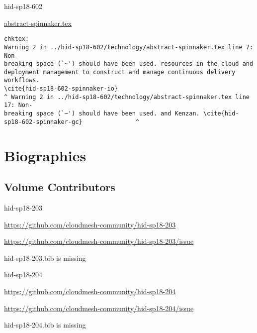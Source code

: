 

\begin{IU}

hid-sp18-602

\href{https://github.com/cloudmesh-community/hid-sp18-602/blob/master//technology/abstract-spinnaker.tex}{abstract-spinnaker.tex}

\begin{tiny}
\begin{verbatim}
chktex:
Warning 2 in ../hid-sp18-602/technology/abstract-spinnaker.tex line 7: Non-
breaking space (`~') should have been used. resources in the cloud and
deployment management to construct and manage continuous delivery workflows.
\cite{hid-sp18-602-spinnaker-io}
^ Warning 2 in ../hid-sp18-602/technology/abstract-spinnaker.tex line 17: Non-
breaking space (`~') should have been used. and Kenzan. \cite{hid-
sp18-602-spinnaker-gc}               ^
\end{verbatim}
\end{tiny}
\end{IU}

\part{Biographies}
\chapter{Volume Contributors}


\begin{IU}

hid-sp18-203

\url{https://github.com/cloudmesh-community/hid-sp18-203}

\url{https://github.com/cloudmesh-community/hid-sp18-203/issue}

hid-sp18-203.bib is missing

\end{IU}


\begin{IU}

hid-sp18-204

\url{https://github.com/cloudmesh-community/hid-sp18-204}

\url{https://github.com/cloudmesh-community/hid-sp18-204/issue}

hid-sp18-204.bib is missing

\end{IU}


